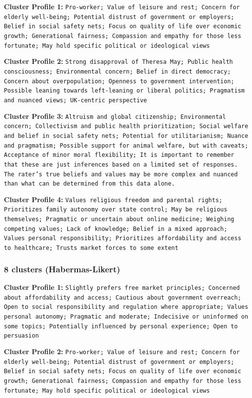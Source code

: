 \documentclass[11pt]{article}
\begin{document}
\textbf{Cluster Profile 1:} \texttt{Pro-worker; Value of leisure and rest; Concern for elderly well-being; Potential distrust of government or employers; Belief in social safety nets; Focus on quality of life over economic growth; Generational fairness; Compassion and empathy for those less fortunate; May hold specific political or ideological views}

\textbf{Cluster Profile 2:} \texttt{Strong disapproval of Theresa May; Public health consciousness; Environmental concern; Belief in direct democracy; Concern about overpopulation; Openness to government intervention; Possible leaning towards left-leaning or liberal politics; Pragmatism and nuanced views; UK-centric perspective}

\textbf{Cluster Profile 3:} \texttt{Altruism and global citizenship; Environmental concern; Collectivism and public health prioritization; Social welfare and belief in social safety nets; Potential for utilitarianism; Nuance and pragmatism; Possible support for animal welfare, but with caveats; Acceptance of minor moral flexibility; It is important to remember that these are just inferences based on a limited set of responses. The rater's true beliefs and values may be more complex and nuanced than what can be determined from this data alone.}

\textbf{Cluster Profile 4:} \texttt{Values religious freedom and parental rights; Prioritizes family autonomy over state control; May be religious themselves; Pragmatic or uncertain about online medicine; Weighing competing values; Lack of knowledge; Belief in a mixed approach; Values personal responsibility; Prioritizes affordability and access to healthcare; Trusts market forces to some extent}

\subsubsection{8 clusters (Habermas-Likert)}

\textbf{Cluster Profile 1:} \texttt{Slightly prefers free market principles; Concerned about affordability and access; Cautious about government overreach; Open to social responsibility and regulation where appropriate; Values personal autonomy; Pragmatic and moderate; Indecisive or uninformed on some topics; Potentially influenced by personal experience; Open to persuasion}

\textbf{Cluster Profile 2:} \texttt{Pro-worker; Value of leisure and rest; Concern for elderly well-being; Potential distrust of government or employers; Belief in social safety nets; Focus on quality of life over economic growth; Generational fairness; Compassion and empathy for those less fortunate; May hold specific political or ideological views}
\end{document}
